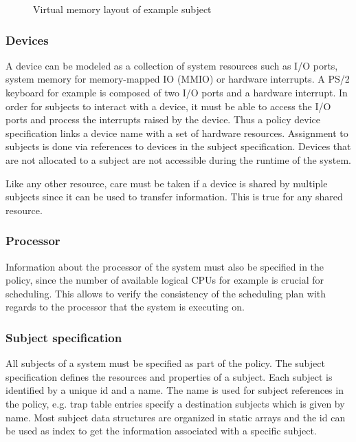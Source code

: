 \begin{figure}[h]
	\centering
	
	\caption{Virtual memory layout of example subject}
	\label{fig:virt-mem-layout-example}
\end{figure}

\subsubsection{Devices}
A device can be modeled as a collection of system resources such as I/O ports,
system memory for memory-mapped IO (MMIO) or hardware interrupts. A PS/2
keyboard for example is composed of two I/O ports and a hardware interrupt.  In
order for subjects to interact with a device, it must be able to access the I/O
ports and process the interrupts raised by the device. Thus a policy device
specification links a device name with a set of hardware resources. Assignment
to subjects is done via references to devices in the subject specification.
Devices that are not allocated to a subject are not accessible during the
runtime of the system.

Like any other resource, care must be taken if a device is shared by multiple
subjects since it can be used to transfer information. This is true for any
shared resource.

\subsubsection{Processor}
Information about the processor of the system must also be specified in the
policy, since the number of available logical CPUs for example is crucial for
scheduling. This allows to verify the consistency of the scheduling plan with
regards to the processor that the system is executing on.

\subsubsection{Subject specification}
All subjects of a system must be specified as part of the policy. The subject
specification defines the resources and properties of a subject. Each subject is
identified by a unique id and a name. The name is used for subject references in
the policy, e.g. trap table entries specify a destination subjects which is
given by name. Most subject data structures are organized in static arrays and
the id can be used as index to get the information associated with a specific
subject.

